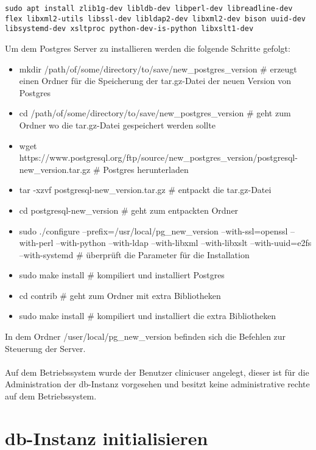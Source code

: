    \texttt{sudo apt install zlib1g-dev libldb-dev libperl-dev libreadline-dev flex libxml2-utils libssl-dev libldap2-dev libxml2-dev bison uuid-dev libsystemd-dev xsltproc python-dev-is-python libxslt1-dev}
    
    Um dem Postgres Server zu installieren werden die folgende Schritte gefolgt:
    
    \begin{itemize}
        \item mkdir /path/of/some/directory/to/save/new\_postgres\_version \# erzeugt einen Ordner für die Speicherung der tar.gz-Datei der neuen Version von Postgres
    	\item cd /path/of/some/directory/to/save/new\_postgres\_version \# geht zum Ordner wo die tar.gz-Datei gespeichert werden sollte
    	\item wget https://www.postgresql.org/ftp/source/new\_postgres\_version/postgresql-new\_version.tar.gz \# Postgres herunterladen
    	\item tar -xzvf postgresql-new\_version.tar.gz \#  entpackt die tar.gz-Datei
    	\item cd postgresql-new\_version \# geht zum entpackten Ordner 
    	\item sudo ./configure --prefix=/usr/local/pg\_new\_version --with-ssl=openssl --with-perl --with-python --with-ldap --with-libxml --with-libxslt --with-uuid=e2fs --with-systemd \# überprüft die Parameter für die Installation
    	\item sudo make install \# kompiliert und installiert Postgres
    	\item cd contrib \# geht zum Ordner mit extra Bibliotheken
    	\item sudo make install \# kompiliert und installiert die extra Bibliotheken
    \end{itemize} 
    
   In dem Ordner /user/local/pg\_new\_version befinden sich die Befehlen zur Steuerung der Server. \\ \\

   Auf dem Betriebssystem wurde der Benutzer \textsf{clinicuser} angelegt, dieser ist für die Administration der \ac{db}-Instanz vorgesehen und besitzt keine administrative rechte auf dem Betriebssystem.
 
   \section{\acs{db}-Instanz initialisieren}
   
